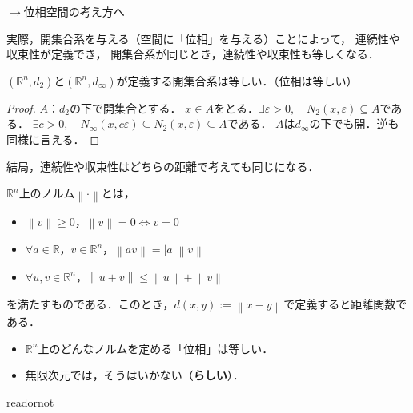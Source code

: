 \documentclass[uplatex]{jsarticle}
\begin{document}
$\longrightarrow$位相空間の考え方へ

実際，開集合系を与える（空間に「位相」を与える）ことによって，
連続性や収束性が定義でき，
開集合系が同じとき，連続性や収束性も等しくなる．

\begin{rei}
    $(\mathbb{R}^{n},d_{2})$と$(\mathbb{R}^{n},d_{\infty})$が定義する開集合系は等しい．（位相は等しい）
    \begin{proof}
        $A$：$d_{2}$の下で開集合とする．
        $x \in A$をとる．$\exists \varepsilon > 0, \quad N_{2}(x,\varepsilon) \subseteq A$である．
        $\exists c > 0, \quad N_{\infty} (x, c \varepsilon) \subseteq N_{2} (x, \varepsilon) \subseteq A$である．
        $A$は$d_{\infty}$の下でも開．逆も同様に言える． 
    \end{proof}
    結局，連続性や収束性はどちらの距離で考えても同じになる．
\end{rei}

\begin{rei}
    $\mathbb{R}^{n}$上のノルム$\left\| \cdot \right\|$とは，
    \begin{itemize}
        \vspace{-0.5\baselineskip}
        \item $\left\| v \right\| \ge 0$，\qquad $\left\| v \right\| = 0 \Longleftrightarrow v = 0$
        \item $\forall a \in \mathbb{R}$，$v \in \mathbb{R}^{n}$，$\left\| av \right\| = \left| a \right| \left\| v \right\|$
        \item $\forall u,v \in \mathbb{R}^{n}$，$\left\| u + v \right\| \le \left\| u \right\| + \left\| v \right\|$
        \vspace{-0.5\baselineskip}
    \end{itemize}
    を満たすものである．このとき，$d(x,y) := \left\| x - y \right\|$で定義すると距離関数である．
\end{rei}

\begin{itemize}
    \vspace{-0.5\baselineskip}
    \item $\mathbb{R}^{n}$上のどんなノルムを定める「位相」は等しい．
    \item 無限次元では，そうはいかない（\textbf{らしい}）．
\end{itemize}

\expandafter\ifx\csname readornot\endcsname\relax
  
\end{document}
